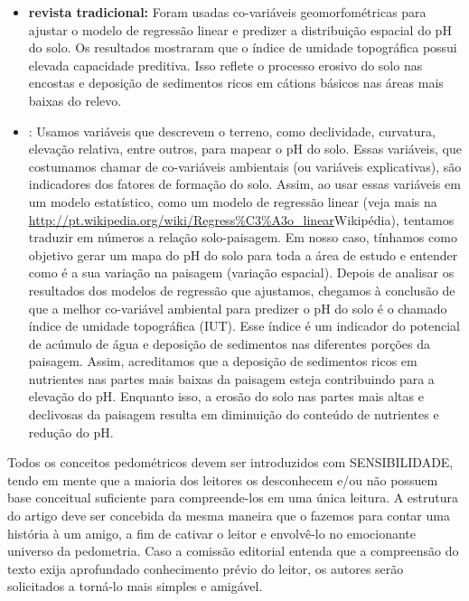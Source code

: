 \begin{itemize}
 \item \textbf{revista tradicional:} Foram usadas co-variáveis geomorfométricas para ajustar o modelo de regressão linear e predizer a distribuição espacial do pH do solo. Os resultados mostraram que o índice de umidade topográfica possui elevada capacidade preditiva. Isso reflete o processo erosivo do solo nas encostas e deposição de sedimentos ricos em cátions básicos nas áreas mais baixas do relevo.
 \item \pedometria: Usamos variáveis que descrevem o terreno, como declividade, curvatura, elevação relativa, entre outros, para mapear o pH do solo. Essas variáveis, que costumamos chamar de co-variáveis ambientais (ou variáveis explicativas), são indicadores dos fatores de formação do solo. Assim, ao usar essas variáveis em um modelo estatístico, como um modelo de regressão linear (veja mais na \url{http://pt.wikipedia.org/wiki/Regress\%C3\%A3o\_linear}{Wikipédia}), tentamos traduzir em números a relação solo-paisagem. Em nosso caso, tínhamos como objetivo gerar um mapa do pH do solo para toda a área de estudo e entender como é a sua variação na paisagem (variação espacial). Depois de analisar os resultados dos modelos de regressão que ajustamos, chegamos à conclusão de que a melhor co-variável ambiental para predizer o pH do solo é o chamado índice de umidade topográfica (IUT). Esse índice é um indicador do potencial de acúmulo de água e deposição de sedimentos nas diferentes porções da paisagem. Assim, acreditamos que a deposição de sedimentos ricos em nutrientes nas partes mais baixas da paisagem esteja contribuindo para a elevação do pH. Enquanto isso, a erosão do solo nas partes mais altas e declivosas da paisagem resulta em diminuição do conteúdo de nutrientes e redução do pH.
\end{itemize}

Todos os conceitos pedométricos devem ser introduzidos com SENSIBILIDADE, tendo em mente que a maioria dos leitores os desconhecem e/ou não possuem base conceitual suficiente para compreende-los em uma única leitura. A estrutura do artigo deve ser concebida da mesma maneira que o fazemos para contar uma história à um amigo, a fim de cativar o leitor e envolvê-lo no emocionante universo da pedometria. Caso a comissão editorial entenda que a compreensão do texto exija aprofundado conhecimento prévio do leitor, os autores serão solicitados a torná-lo mais simples e amigável.

